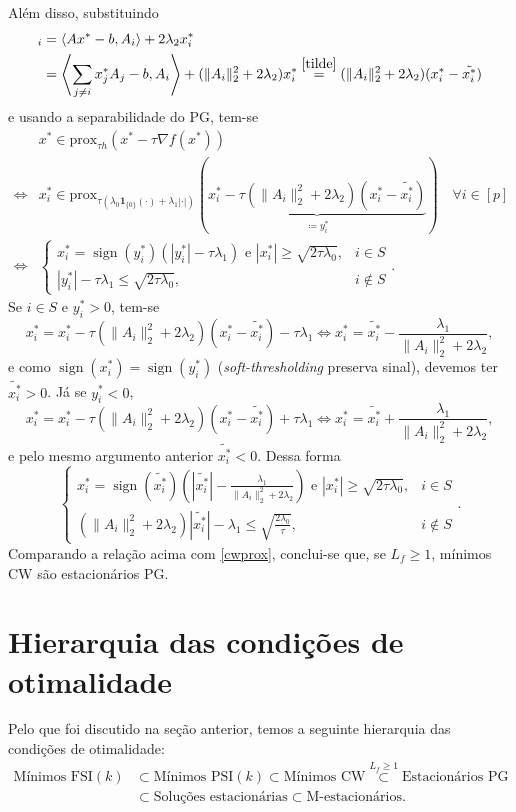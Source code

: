 Além disso, substituindo 
\begin{align*}
[\nabla f(x^*)]_i&=\inner{Ax^*-b, A_i}+2\lambda_2x^*_i\\&=\inner{\sum_{j\neq i}x_j^*A_j-b,A_i}+(\|A_i\|_2^2+2\lambda_2)x^*_i\overset{\eqref{tilde}}{=}(\|A_i\|_2^2+2\lambda_2)(x^*_i-\tilde{x^*_i})
\end{align*}
e usando a separabilidade do PG, tem-se
\[\begin{aligned}
&x^*\in\mathrm{prox}_{\tau h}(x^* - \tau \nabla f(x^*))\\\iff & x^*_i\in \mathrm{prox}_{\tau (\lambda_0\mathbf{1}_{\{0\}}(\cdot)+\lambda_1|\cdot|)}(\underbrace{x^*_i - \tau (\|A_i\|_2^2+2\lambda_2)(x^*_i-\tilde{x^*_i})}_{\coloneq y_i^*})\quad \forall i\in [p]\\\iff & \begin{cases}
    x^*_i =\operatorname{sign}(y_i^*)(|y_i^*|-\tau\lambda_1)\text{ e }|x^*_i|\geq \sqrt{2\tau\lambda_0}, & i\in S\\
    |y_i^*|-\tau\lambda_1\leq \sqrt{2\tau\lambda_0}, & i\notin S
\end{cases}.
\end{aligned}\]
Se $i\in S$ e $y^*_i>0$, tem-se
\[
x^*_i=x^*_i - \tau (\|A_i\|_2^2+2\lambda_2)(x^*_i-\tilde{x^*_i})-\tau\lambda_1\iff x^*_i =\tilde{x^*_i}-\frac{\lambda_1}{\|A_i\|_2^2+2\lambda_2},
\]
e como $\operatorname{sign}(x^*_i)=\operatorname{sign}(y^*_i)$ (\textit{soft-thresholding} preserva sinal), devemos ter $\tilde{x^*_i}>0$. Já se $y^*_i<0$, 
\[
x^*_i=x^*_i - \tau (\|A_i\|_2^2+2\lambda_2)(x^*_i-\tilde{x^*_i})+\tau\lambda_1\iff x^*_i =\tilde{x^*_i}+\frac{\lambda_1}{\|A_i\|_2^2+2\lambda_2},
\]
e pelo mesmo argumento anterior $\tilde{x^*_i}<0$. Dessa forma
\[
\begin{cases}
    x^*_i =\operatorname{sign}(\tilde{x^*_i})\left(|\tilde{x^*_i}|-\frac{\lambda_1}{\|A_i\|_2^2+2\lambda_2}\right)\text{ e }|x^*_i|\geq \sqrt{2\tau\lambda_0}, & i\in S\\
    (\|A_i\|_2^2+2\lambda_2)|\tilde{x^*_i}|-\lambda_1\leq\sqrt{\frac{2\lambda_0}{\tau}}, & i\notin S
\end{cases}.\]
Comparando a relação acima com \eqref{cwprox}, conclui-se que, se $L_f\geq 1$, mínimos CW são estacionários PG.

\section{Hierarquia das condições de otimalidade}
Pelo que foi discutido na seção anterior, temos a seguinte hierarquia das condições de otimalidade:
\begin{equation}\begin{aligned}
    \text{Mínimos FSI}(k)&\subset\text{Mínimos PSI}(k)\subset \text{Mínimos CW}\overset{L_f\geq 1}{\subset}\text{Estacionários PG}\\&\subset\text{Soluções estacionárias}\subset\text{M-estacionários}.\label{hier}
\end{aligned}\end{equation}

